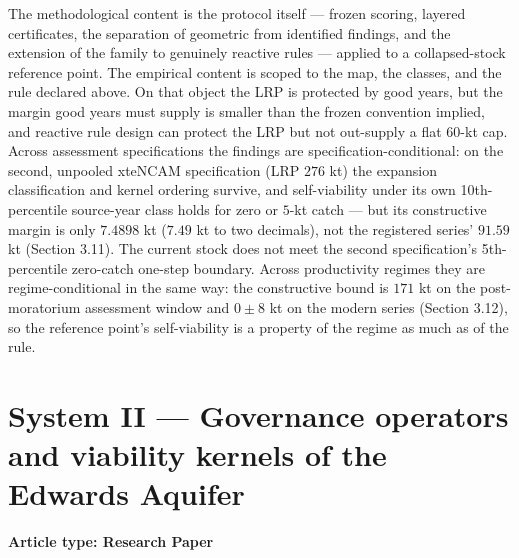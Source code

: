 \documentclass[11pt]{article}
\begin{document}
The methodological content is the protocol itself --- frozen scoring,
layered certificates, the separation of geometric from identified
findings, and the extension of the family to genuinely reactive rules
--- applied to a collapsed-stock reference point. The empirical content
is scoped to the map, the classes, and the rule declared above. On that
object the LRP is protected by good years, but the margin good years
must supply is smaller than the frozen convention implied, and reactive
rule design can protect the LRP but not out-supply a flat 60-kt cap.
Across assessment specifications the findings are
specification-conditional: on the second, unpooled xteNCAM specification
(LRP \(276\) kt) the expansion classification and kernel ordering
survive, and self-viability under its own 10th-percentile source-year
class holds for zero or \(5\)-kt catch --- but its constructive margin
is only \(7.4898\) kt (\(7.49\) kt to two decimals), not the registered series' \(91.59\) kt
(Section 3.11). The current stock does not meet the second
specification's 5th-percentile zero-catch one-step boundary. Across productivity regimes they are
regime-conditional in the same way: the constructive bound is
\(171\) kt on the post-moratorium assessment window and \(0 \pm 8\)
kt on the modern series (Section 3.12), so the reference point's
self-viability is a property of the regime as much as of the rule.

\part*{System II --- Governance operators and viability kernels of the Edwards Aquifer}
\label{part:edwards}

{\centering\small \textbf{Article type: Research Paper}\par}
\end{document}
